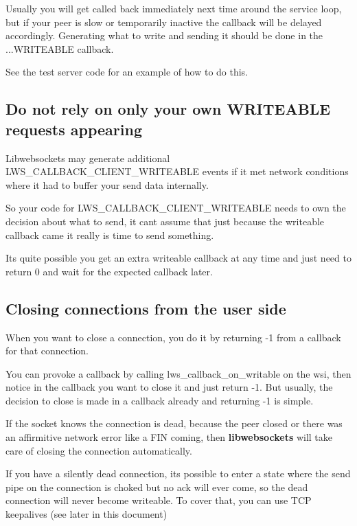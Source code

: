 Usually you will get called back immediately next time around the service loop, but if your peer is slow or temporarily inactive the callback will be delayed accordingly. Generating what to write and sending it should be done in the ...W\+R\+I\+T\+E\+A\+B\+LE callback.

See the test server code for an example of how to do this.

\subsection*{Do not rely on only your own W\+R\+I\+T\+E\+A\+B\+LE requests appearing }

Libwebsockets may generate additional {\ttfamily L\+W\+S\+\_\+\+C\+A\+L\+L\+B\+A\+C\+K\+\_\+\+C\+L\+I\+E\+N\+T\+\_\+\+W\+R\+I\+T\+E\+A\+B\+LE} events if it met network conditions where it had to buffer your send data internally.

So your code for {\ttfamily L\+W\+S\+\_\+\+C\+A\+L\+L\+B\+A\+C\+K\+\_\+\+C\+L\+I\+E\+N\+T\+\_\+\+W\+R\+I\+T\+E\+A\+B\+LE} needs to own the decision about what to send, it can\textquotesingle{}t assume that just because the writeable callback came it really is time to send something.

It\textquotesingle{}s quite possible you get an \textquotesingle{}extra\textquotesingle{} writeable callback at any time and just need to {\ttfamily return 0} and wait for the expected callback later.

\subsection*{Closing connections from the user side }

When you want to close a connection, you do it by returning {\ttfamily -\/1} from a callback for that connection.

You can provoke a callback by calling {\ttfamily lws\+\_\+callback\+\_\+on\+\_\+writable} on the wsi, then notice in the callback you want to close it and just return -\/1. But usually, the decision to close is made in a callback already and returning -\/1 is simple.

If the socket knows the connection is dead, because the peer closed or there was an affirmitive network error like a F\+IN coming, then {\bfseries libwebsockets} will take care of closing the connection automatically.

If you have a silently dead connection, it\textquotesingle{}s possible to enter a state where the send pipe on the connection is choked but no ack will ever come, so the dead connection will never become writeable. To cover that, you can use T\+CP keepalives (see later in this document)

